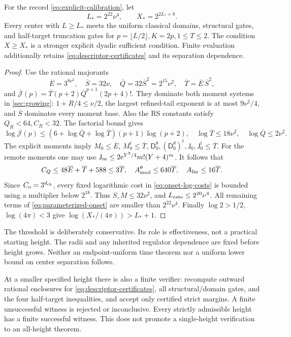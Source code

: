 \begin{theorem}\label{thm:explicit-onset}
For the record \eqref{eq:explicit-calibration}, let
\begin{equation}
 L_*=2^{22}\nu^4,\qquad X_*=2^{2L_*+8}.
 \label{eq:closed-onset}
\end{equation}
Every center with \(L\ge L_*\) meets the uniform classical domains,
structural gates, and half-target truncation gates for
\(p=\lfloor L/2\rfloor,K=2p,1\le T\le2\).
The condition \(X\ge X_*\) is a stronger explicit dyadic sufficient
condition. Finite evaluation additionally retains
\eqref{eq:descriptor-certificates} and its separation dependence.
\end{theorem}
\begin{proof}
Use the rational majorants
\[
 \overline E=3^{8\nu^2},\quad\overline S=32\nu,\quad
 \overline Q=32\overline S^2=2^{15}\nu^2,\quad
 \overline T=\overline E\,\overline S^2,
\]
and \(\overline{\mathcal J}(p)=
\overline T(p+2)\overline Q^{p+1}(2p+4)!\).
They dominate both moment systems in \cref{sec:growing}:
\(1+R/4\le\nu/2\), the largest refined-tail exponent is at most
\(9\nu^2/4\), and \(\overline S\) dominates every moment base.
Also the RS constants satisfy \(Q_R<64,C_R<32\).
The factorial bound gives
\[
 \log\overline{\mathcal J}(p)
 \le(6+\log\overline Q+\log\overline T)(p+1)\log(p+2),
 \quad\log\overline T\le18\nu^2,\quad\log\overline Q\le2\nu^2.
\]
The explicit moments imply
\(M_0\le\overline E\), \(M_0^t\le\overline T\),
\(\mathsf D_0^\theta,(\mathsf D_0^\theta)^t,
\mathsf J_0,\mathsf J_0^t\le\overline T\).
For the remote moments one may use
\(\mathsf J_m\le2\mathrm e^{Y^2/4}m!(Y+4)^m\).
It follows that
\[
 C_Q\le48\overline E+\overline T+588\le3\overline T,
 \quad A_{\rm mod}^\theta\le640\overline T,
 \quad A_{\rm far}\le16\overline T.
\]
Since \(C_{\mathrm o}=3^{d_{\rm ch}}\), every fixed logarithmic
cost in \eqref{eq:onset-log-costs} is bounded using a multiplier
below \(2^{18}\). Thus \(S,M\le32\nu^2\), and
\(L_{\rm rate}\le2^{20}\nu^4\).
All remaining terms of \eqref{eq:parameterized-onset} are smaller than
\(2^{22}\nu^4\). Finally \(\log2>1/2\), \(\log(4\pi)<3\)
give \(\log(X_*/(4\pi))>L_*+1\).
\end{proof}
The threshold is deliberately conservative. Its role is effectiveness,
not a practical starting height. The radii and any inherited regulator
dependence are fixed before height grows. Neither an endpoint-uniform
time theorem nor a uniform lower bound on center separation follows.

At a smaller specified height there is also a finite verifier: recompute
outward rational enclosures for \eqref{eq:descriptor-certificates}, all
structural/domain gates, and the four half-target inequalities, and
accept only certified strict margins. A finite unsuccessful witness is
rejected or inconclusive. Every strictly admissible height has a finite
successful witness. This does not promote a single-height verification
to an all-height theorem.

